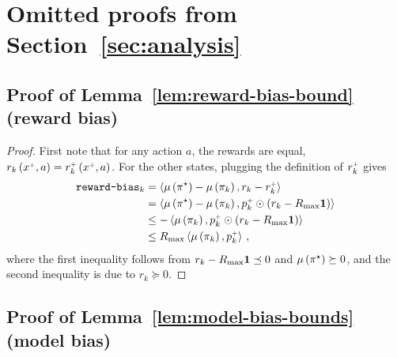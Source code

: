 \section{Omitted proofs from Section~\ref{sec:analysis}}
\label{app:analysis-proofs}

\subsection{Proof of Lemma~\ref{lem:reward-bias-bound} (reward bias)}
\label{app:reward-bias-bound}

\rewardbiasbound*

\begin{proof}
    First note that for any action $a$, the rewards are equal, \ie $r_k \left( x^{\mathsf{\scriptscriptstyle +}}, a \right) = r_k^{\mathsf{\scriptscriptstyle +}} \left( x^{\mathsf{\scriptscriptstyle +}}, a \right)$. For the other states, plugging the definition of $r_k^{\mathsf{\scriptscriptstyle +}}$ gives
    \begin{align*}
        \texttt{reward-bias}_k &= \left\langle \mu \left( \pi^\star \right) - \mu \left( \pi_k \right), r_k - r_k^{\mathsf{\scriptscriptstyle +}} \right\rangle \\
        &= \left\langle \mu \left( \pi^\star \right) - \mu \left( \pi_k \right), p_k^{\mathsf{\scriptscriptstyle +}} \odot \left( r_k - R_{\max} \mathbf{1} \right) \right\rangle \\
        &\leq - \left\langle \mu \left( \pi_k \right), p_k^{\mathsf{\scriptscriptstyle +}} \odot \left( r_k - R_{\max} \mathbf{1} \right) \right\rangle \\
        &\leq R_{\max} \left\langle \mu \left( \pi_k \right), p_k^{\mathsf{\scriptscriptstyle +}} \right\rangle\,,
    \end{align*}
    where the first inequality follows from $r_k - R_{\max} \mathbf{1} \preceq 0$ and $\mu \left( \pi^\star \right) \succeq 0$, and the second inequality is due to $r_k \succeq 0$.
\end{proof}


    \subsection{Proof of Lemma~\ref{lem:model-bias-bounds} (model bias)}
    \label{app:model-bias-bounds}

\modelbiasbounds*


